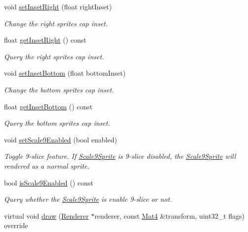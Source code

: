 \begin{DoxyCompactItemize}
void \hyperlink{classui_1_1Scale9Sprite_a7276d1dcf47579a368948f1cf84a3c41}{set\+Inset\+Right} (float right\+Inset)
\begin{DoxyCompactList}\small\item\em Change the right sprite\textquotesingle{}s cap inset. \end{DoxyCompactList}\item 
float \hyperlink{classui_1_1Scale9Sprite_a598b4d64677b29bea474ff7ba563d044}{get\+Inset\+Right} () const
\begin{DoxyCompactList}\small\item\em Query the right sprite\textquotesingle{}s cap inset. \end{DoxyCompactList}\item 
void \hyperlink{classui_1_1Scale9Sprite_ad0a272ccfedc20c30359371daddd6fd3}{set\+Inset\+Bottom} (float bottom\+Inset)
\begin{DoxyCompactList}\small\item\em Change the bottom sprite\textquotesingle{}s cap inset. \end{DoxyCompactList}\item 
float \hyperlink{classui_1_1Scale9Sprite_a874f740bd66678433e1eaa6851f6256f}{get\+Inset\+Bottom} () const
\begin{DoxyCompactList}\small\item\em Query the bottom sprite\textquotesingle{}s cap inset. \end{DoxyCompactList}\item 
void \hyperlink{classui_1_1Scale9Sprite_a958f507e81b8c94a1b72eeeeb2f57ce7}{set\+Scale9\+Enabled} (bool enabled)
\begin{DoxyCompactList}\small\item\em Toggle 9-\/slice feature. If \hyperlink{classui_1_1Scale9Sprite}{Scale9\+Sprite} is 9-\/slice disabled, the \hyperlink{classui_1_1Scale9Sprite}{Scale9\+Sprite} will rendered as a normal sprite. \end{DoxyCompactList}\item 
bool \hyperlink{classui_1_1Scale9Sprite_a226624d2403645ac803e0935c6caf9a7}{is\+Scale9\+Enabled} () const
\begin{DoxyCompactList}\small\item\em Query whether the \hyperlink{classui_1_1Scale9Sprite}{Scale9\+Sprite} is enable 9-\/slice or not. \end{DoxyCompactList}\item 
virtual void \hyperlink{classui_1_1Scale9Sprite_ae16122e957d7bc7de809d06006b7d6f3}{draw} (\hyperlink{classRenderer}{Renderer} $\ast$renderer, const \hyperlink{classMat4}{Mat4} \&transform, uint32\+\_\+t flags) override

\end{DoxyCompactItemize}
